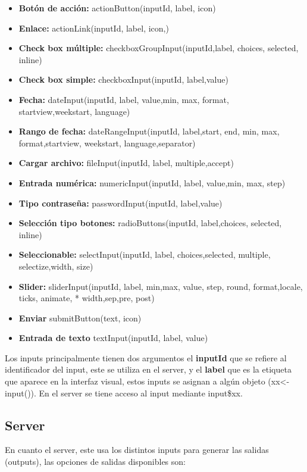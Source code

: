 \documentclass[
]{book}
\providecommand{\tightlist}{%
  \setlength{\itemsep}{0pt}\setlength{\parskip}{0pt}}
\begin{document}
\begin{itemize}
\tightlist
\item
  \textbf{Botón de acción:} actionButton(inputId, label, icon)
\item
  \textbf{Enlace:} actionLink(inputId, label, icon,)
\item
  \textbf{Check box múltiple:} checkboxGroupInput(inputId,label, choices, selected, inline)
\item
  \textbf{Check box simple:} checkboxInput(inputId, label,value)
\item
  \textbf{Fecha:} dateInput(inputId, label, value,min, max, format, startview,weekstart, language)
\item
  \textbf{Rango de fecha:} dateRangeInput(inputId, label,start, end, min, max, format,startview, weekstart, language,separator)
\item
  \textbf{Cargar archivo:} fileInput(inputId, label, multiple,accept)
\item
  \textbf{Entrada numérica:} numericInput(inputId, label, value,min, max, step)
\item
  \textbf{Tipo contraseña:} passwordInput(inputId, label,value)
\item
  \textbf{Selección tipo botones:} radioButtons(inputId, label,choices, selected, inline)
\item
  \textbf{Seleccionable:} selectInput(inputId, label, choices,selected, multiple, selectize,width, size)
\item
  \textbf{Slider:} sliderInput(inputId, label, min,max, value, step, round, format,locale, ticks, animate, * width,sep,pre, post)
\item
  \textbf{Enviar} submitButton(text, icon)
\item
  \textbf{Entrada de texto} textInput(inputId, label, value)
\end{itemize}

Los inputs principalmente tienen dos argumentos el \textbf{inputId} que se refiere al identificador del input, este se utiliza en el server, y el \textbf{label} que es la etiqueta que aparece en la interfaz visual, estos inputs se asignan a algún objeto (xx\textless-input()). En el server se tiene acceso al input mediante input\$xx.

\hypertarget{server}{%
\subsection{Server}\label{server}}

En cuanto el server, este usa los distintos inputs para generar las salidas (outputs), las opciones de salidas disponibles son:
\end{document}
